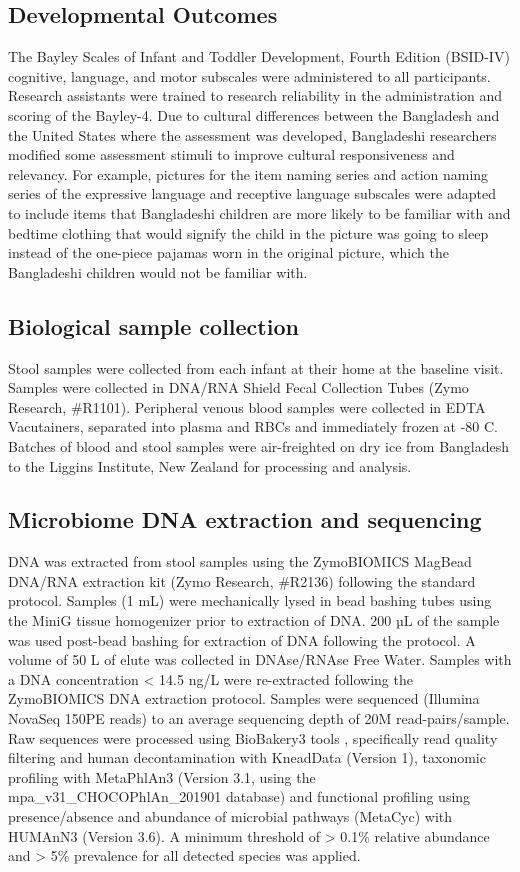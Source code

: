 \documentclass{article}
\begin{document}
\subsection*{Developmental Outcomes} 
The Bayley Scales of Infant and Toddler Development, Fourth Edition (BSID-IV) cognitive, language, and motor subscales were administered to all participants.
Research assistants were trained to research reliability in the administration and scoring of the Bayley-4.
Due to cultural differences between the Bangladesh and the United States where the assessment was developed, Bangladeshi researchers modified some assessment stimuli to improve cultural responsiveness and relevancy.
For example, pictures for the item naming series and action naming series of the expressive language and receptive language subscales were adapted to include items that Bangladeshi children are more likely to be familiar with and bedtime clothing that would signify the child in the picture was going to sleep instead of the one-piece pajamas worn in the original picture, which the Bangladeshi children would not be familiar with. 

\subsection*{Biological sample collection}
Stool samples were collected from each infant at their home at the baseline visit.
Samples were collected in DNA/RNA Shield Fecal Collection Tubes (Zymo Research, \#R1101).
Peripheral venous blood samples were collected in EDTA Vacutainers, separated into plasma and RBCs and immediately frozen at -80 C.
Batches of blood and stool samples were air-freighted on dry ice from Bangladesh to the Liggins Institute, New Zealand for processing and analysis. 

\subsection*{Microbiome DNA extraction and sequencing}
DNA was extracted from stool samples using the ZymoBIOMICS MagBead DNA/RNA extraction kit (Zymo Research, \#R2136) following the standard protocol.
Samples (1 mL) were mechanically lysed in bead bashing tubes using the MiniG tissue homogenizer prior to extraction of DNA.
200 µL of the sample was used post-bead bashing for extraction of DNA following the protocol.
A volume of 50 \textmu{} L of elute was collected in DNAse/RNAse Free Water.
Samples with a DNA concentration \textless{} 14.5 ng/\textmu{}L were re-extracted following the ZymoBIOMICS DNA extraction protocol.
Samples were sequenced (Illumina NovaSeq 150PE reads) to an average sequencing depth of 20M read-pairs/sample.
Raw sequences were processed using BioBakery3 tools \cite{beghini2021integrating}, specifically read quality filtering and human decontamination with KneadData (Version 1), taxonomic profiling with MetaPhlAn3 (Version 3.1, using the mpa\_v31\_CHOCOPhlAn\_201901 database) and functional profiling using presence/absence and abundance of microbial pathways (MetaCyc) with HUMAnN3 (Version 3.6).
A minimum threshold of \textgreater{} 0.1\% relative abundance and \textgreater{} 5\% prevalence for all detected species was applied. 
\end{document}
